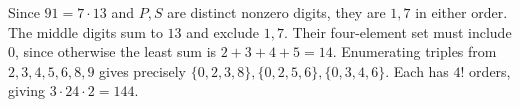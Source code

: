 Since $91=7\cdot13$ and $P,S$ are distinct nonzero digits, they are $1,7$ in either order. The middle digits sum to $13$ and exclude $1,7$. Their four-element set must include $0$, since otherwise the least sum is $2+3+4+5=14$. Enumerating triples from $2,3,4,5,6,8,9$ gives precisely $\{0,2,3,8\},\{0,2,5,6\},\{0,3,4,6\}$. Each has $4!$ orders, giving $3\cdot24\cdot2=\boxed{144}$.
